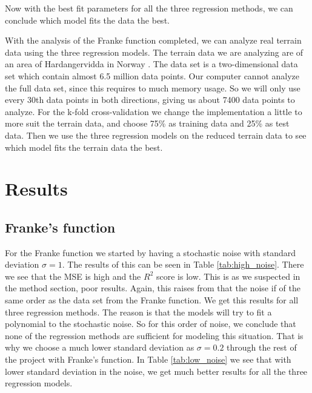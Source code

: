 \documentclass[12pt,a4paper,english]{article}
\begin{document}
Now with the best fit parameters for all the three regression methods, we can conclude which model fits the data the best.

With the analysis of the Franke function completed, we can analyze real terrain data using the three regression models. The terrain data we are analyzing are of an area of Hardangervidda in Norway \cite{earthexplorer}. The data set is a two-dimensional data set which contain almost 6.5 million data points. Our computer cannot analyze the full data set, since this requires to much memory usage. So we will only use every 30th data points in both directions, giving us about 7400 data points to analyze. For the k-fold cross-validation we change the implementation a little to more suit the terrain data, and choose 75\% as training data and 25\% as test data. Then we use the three regression models on the reduced terrain data to see which model fits the terrain data the best.

\section{Results}
\subsection{Franke's function}
For the Franke function we started by having a stochastic noise with standard deviation $\sigma=1$. The results of this can be seen in Table \ref{tab:high_noise}. There we see that the MSE is high and the $R^2$ score is low. This is as we suspected in the method section, poor results. Again, this raises from that the noise if of the same order as the data set from the Franke function. We get this results for all three regression methods. The reason is that the models will try to fit a polynomial to the stochastic noise. So for this order of noise, we conclude that none of the regression methods are sufficient for modeling this situation. That is why we choose a much lower standard deviation as $\sigma=0.2$ through the rest of the project with Franke's function. In Table \ref{tab:low_noise} we see that with lower standard deviation in the noise, we get much better results for all the three regression models.
\end{document}

